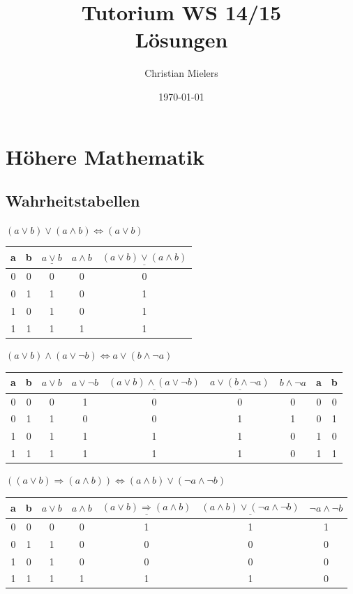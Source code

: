 \documentclass[11pt, a4paper]{article}
\title{Tutorium WS 14/15 \\ Lösungen}
\author{Christian Mielers}
\date{\today}
\begin{document}
\maketitle
\tableofcontents	

\newpage
\section{Höhere Mathematik}
\subsection{Wahrheitstabellen}
$(a \lor b) \lor (a \land b) \Leftrightarrow (a \lor b)$ \\
\begin{tabular}{|c|c|c|c|c|}
	\hline
	a & b & $\underline{a \lor b}$ & $a \land b$ & $\underline{(a \lor b) \lor (a \land b)}$ \vphantom{\Big(}\\
	\hline
  0 & 0 & 0 & 0 & 0\\
  0 & 1 & 1 & 0 & 1\\
  1 & 0 & 1 & 0 & 1\\
  1 & 1 & 1 & 1 & 1\\
   \hline
\end{tabular}

$(a \lor b) \land (a \lor \lnot b) \Leftrightarrow a \lor (b \land \lnot a)$ \\
\begin{tabular}{|c|c|c|c|c||c|c|c|c|}
	\hline
	a & b & $a \lor b$ & $a \lor \lnot b$ & $\underline{(a \lor b) \land (a \lor \lnot b)}$ &
	$\underline{a \lor (b \land \lnot a)}$ & $b \land \lnot a$ & a & b \vphantom{\Big(} \\
	\hline
	0 & 0 & 0 & 1 & 0 & 0 & 0 & 0 & 0\\
  0 & 1 & 1 & 0 & 0 & 1 & 1 & 0 & 1\\
  1 & 0 & 1 & 1 & 1 & 1 & 0 & 1 & 0\\
  1 & 1 & 1 & 1 & 1 & 1 & 0 & 1 & 1\\
  \hline
\end{tabular}

$\left((a \lor b) \Rightarrow (a \land b) \right) \Leftrightarrow (a \land b) \lor (\lnot a \land \lnot b)$ \\
\begin{tabular}{|c|c|c|c|c||c|c|}
	\hline
	a & b & $a \lor b$ & $a \land b$ & $\underline{(a \lor b) \Rightarrow (a \land b)}$ &
	$\underline{(a \land b) \lor (\lnot a \land \lnot b)}$ & $\lnot a \land \lnot b$ \vphantom{\Big(} \\
	\hline
  0 & 0 & 0 & 0 & 1 & 1 & 1\\
  0 & 1 & 1 & 0 & 0 & 0 & 0\\
  1 & 0 & 1 & 0 & 0 & 0 & 0\\
  1 & 1 & 1 & 1 & 1 & 1 & 0\\
  \hline
\end{tabular}
\end{document}
